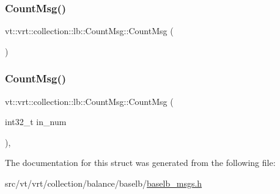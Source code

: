 \subsubsection{\texorpdfstring{Count\+Msg()}{CountMsg()}\hspace{0.1cm}{\footnotesize\ttfamily [1/2]}}
{\footnotesize\ttfamily vt\+::vrt\+::collection\+::lb\+::\+Count\+Msg\+::\+Count\+Msg (\begin{DoxyParamCaption}{ }\end{DoxyParamCaption})\hspace{0.3cm}{\ttfamily [delete]}}

\mbox{\label{structvt_1_1vrt_1_1collection_1_1lb_1_1_count_msg_ab5f72606b12d09ef4d900c6f79c59ddf}} 
\subsubsection{\texorpdfstring{Count\+Msg()}{CountMsg()}\hspace{0.1cm}{\footnotesize\ttfamily [2/2]}}
{\footnotesize\ttfamily vt\+::vrt\+::collection\+::lb\+::\+Count\+Msg\+::\+Count\+Msg (\begin{DoxyParamCaption}\item[{int32\+\_\+t}]{in\+\_\+num }\end{DoxyParamCaption})\hspace{0.3cm}{\ttfamily [inline]}, {\ttfamily [explicit]}}



The documentation for this struct was generated from the following file\+:\begin{DoxyCompactItemize}
\item 
src/vt/vrt/collection/balance/baselb/\hyperlink{baselb__msgs_8h}{baselb\+\_\+msgs.\+h}\end{DoxyCompactItemize}
